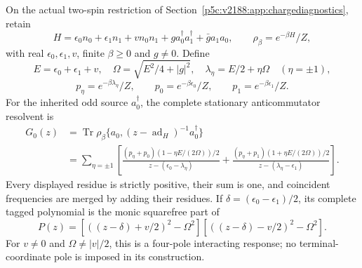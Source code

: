 \documentclass[11pt,a4paper]{article}
\begin{document}
\begin{theorem}
\label{p5c:thm:v248-paired-quartic-source-poles}
On the actual two-spin restriction of
Section~\ref{p5c:v2188:app:chargediagnostics}, retain
\[
 H=\epsilon_0n_0+\epsilon_1n_1+v n_0n_1
       +g a_0^\dagger a_1^\dagger+\bar g a_1a_0,
 \qquad \rho_\beta=e^{-\beta H}/Z,
\]
with real $\epsilon_0,\epsilon_1,v$, finite $\beta\ge0$ and
$g\ne0$. Define
\[
 E=\epsilon_0+\epsilon_1+v,\quad
 \Omega=\sqrt{E^2/4+|g|^2},\quad
 \lambda_\eta=E/2+\eta\Omega\quad(\eta=\pm1),
\]
\[
 p_\eta=e^{-\beta\lambda_\eta}/Z,\qquad
 p_0=e^{-\beta\epsilon_0}/Z,\qquad
 p_1=e^{-\beta\epsilon_1}/Z.
\]
For the inherited odd source $a_0^\dagger$, the complete stationary
anticommutator resolvent is
\[
 \boxed{\begin{aligned}
 G_0(z)&=\operatorname{Tr}\rho_\beta
  \{a_0,(z-\operatorname{ad}_H)^{-1}a_0^\dagger\}\\
 &=\sum_{\eta=\pm1}\left[
 \frac{(p_\eta+p_0)(1-\eta E/(2\Omega))/2}
      {z-(\epsilon_0-\lambda_\eta)}
 +\frac{(p_\eta+p_1)(1+\eta E/(2\Omega))/2}
      {z-(\lambda_\eta-\epsilon_1)}\right].
 \end{aligned}}
\]
Every displayed residue is strictly positive, their sum is one, and
coincident frequencies are merged by adding their residues. If
$\delta=(\epsilon_0-\epsilon_1)/2$, its complete tagged polynomial
is the monic squarefree part of
\[
 \boxed{P(z)=
 [((z-\delta)+v/2)^2-\Omega^2]
 [((z-\delta)-v/2)^2-\Omega^2].}
\]
For $v\ne0$ and $\Omega\ne|v|/2$, this is a four-pole interacting
response; no terminal-coordinate pole is imposed in its construction.
\end{theorem}
\end{document}
